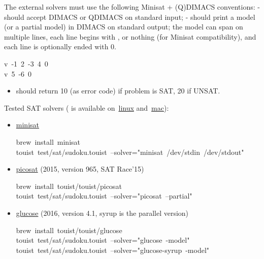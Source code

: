 The external solvers must use the following Minisat + (Q)DIMACS conventions:
- should accept DIMACS or QDIMACS on standard input;
- should print a model (or a partial model) in DIMACS on standard output; the
  model can span on multiple lines, each line begins with , 
  or nothing (for Minisat compatibility), and each line is optionally ended
  with 0.%
\begin{mdpre}%
\noindent{}v~-1~2~-3~4~0\\
v~5~-6~0%
\end{mdpre}
\begin{itemize}[noitemsep,topsep=\mdcompacttopsep]%

\item should return 10 (as error code) if problem is SAT, 20 if UNSAT.%
\end{itemize}%

\noindent Tested SAT solvers ( is available on~\href{http://linuxbrew.sh}{linux} and~\href{https://brew.sh}{mac}):%

\begin{itemize}%

\item{}
\href{http://minisat.se}{minisat}%
\begin{mdpre}%
\noindent brew~install~minisat\\
touist~test/sat/sudoku.touist~--solver="minisat~/dev/stdin~/dev/stdout"%
\end{mdpre}%

\item{}
\href{http://fmv.jku.at/picosat}{picosat} (2015, version 965, SAT Race'15)%
\begin{mdpre}%
\noindent brew~install~touist/touist/picosat\\
touist~test/sat/sudoku.touist~--solver="picosat~--partial"%
\end{mdpre}%

\item{}
\href{https://www.labri.fr/perso/lsimon/glucose}{glucose} (2016, version 4.1, syrup is the parallel version)%
\begin{mdpre}%
\noindent brew~install~touist/touist/glucose\\
touist~test/sat/sudoku.touist~--solver="glucose~-model"\\
touist~test/sat/sudoku.touist~--solver="glucose-syrup~-model"%
\end{mdpre}%
\end{itemize}%

